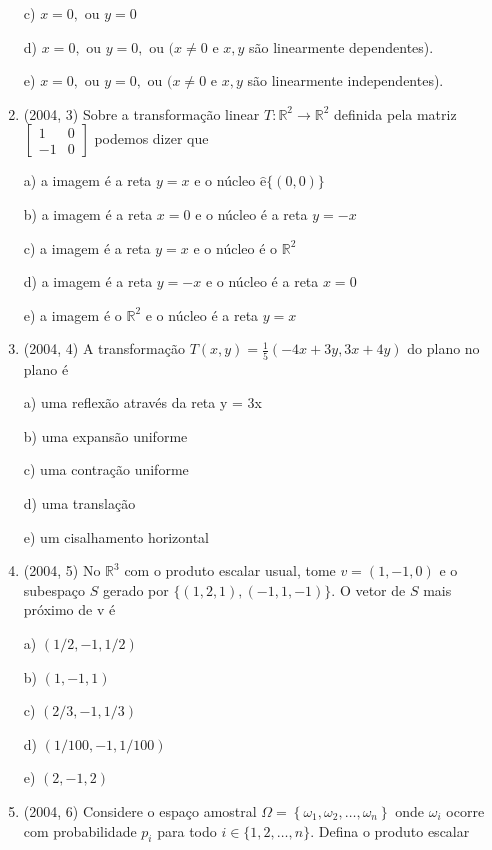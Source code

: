 \documentclass{article}
\begin{document}
\begin{enumerate}
c) $x=0,$ ou $y=0$

d) $x=0,$ ou $y=0,$ ou $(x \neq 0 \text { e } x, y$ são linearmente dependentes).

e) $x=0,$ ou $y=0,$ ou $(x \neq 0 \text { e } x, y$ são linearmente independentes). \newline


\item(2004, 3) Sobre a transformação linear $T : \mathbb{R}^{2} \rightarrow \mathbb{R}^{2}$ definida pela matriz $\left[\begin{array}{cc}{1} & {0} \\ {-1} & {0}\end{array}\right]$ podemos dizer que 

a) a imagem é a reta $y=x$ e o núcleo $\hat{\mathrm{e}}\{(0,0)\}$

b) a imagem é a reta $x=0$ e o núcleo é a reta $y=-x$

c) a imagem é a reta $y=x$ e o núcleo é o $\mathbb{R}^{2}$

d) a imagem é a reta $y=-x$ e o núcleo é a reta $x=0$

e) a imagem é o $\mathbb{R}^{2}$ e o núcleo é a reta $y=x$\newline



\item(2004, 4) A transformação $T(x, y)=\frac{1}{5}(-4 x+3 y, 3 x+4 y)$ do plano no plano é

a) uma reflexão através da reta y = 3x

b) uma expansão uniforme

c) uma contração uniforme

d) uma translação

e) um cisalhamento horizontal\newline



\item(2004, 5) No $\mathbb{R}^{3}$ com o produto escalar usual, tome $v=(1,-1,0)$ e o subespaço $S$ gerado por
$\{(1,2,1),(-1,1,-1)\} .$ O vetor de $S$ mais próximo de v é

a) $(1 / 2,-1,1 / 2)$

b) $(1,-1,1)$

c) $(2 / 3,-1,1 / 3)$

d) $(1 / 100,-1,1 / 100)$

e) $(2,-1,2)$\newline


\item(2004, 6) Considere o espaço amostral $\Omega=\left\{\omega_{1}, \omega_{2}, \ldots, \omega_{n}\right\}$ onde $\omega_{i}$ ocorre com probabilidade $p_{i}$ para todo $i \in\{1,2, \ldots, n\} .$ Defina o produto escalar


\end{enumerate}
\end{document}
